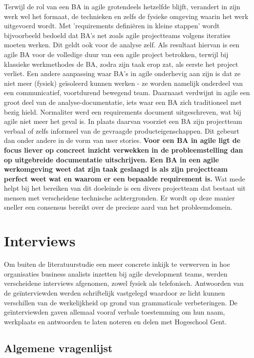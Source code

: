 \documentclass{hogent-article}
\begin{document}
Terwijl de rol van een BA in agile grotendeels hetzelfde blijft, verandert in zijn werk wel 
het formaat, de technieken en zelfs de fysieke omgeving waarin het werk uitgevoerd wordt. 
Met 'requirements definiëren in kleine stappen' wordt bijvoorbeeld bedoeld dat BA's net zoals
agile projectteams volgens iteraties moeten werken. Dit geldt ook voor de analyse zelf.
Als resultaat hiervan is een agile BA voor de volledige duur van een agile project betrokken,
terwijl bij klassieke werkmethodes de BA, zodra zijn taak erop zat, als eerste het project 
verliet. Een andere aanpassing waar BA's in agile onderhevig aan zijn is dat ze niet meer (fysiek)
geïsoleerd kunnen werken - ze worden namelijk onderdeel van een communicatief, voortdurend
bewegend team. Daarnaast verdwijnt in agile een groot deel van de analyse-documentatie, iets waar 
een BA zich traditioneel met bezig hield. Normaliter werd een requirements document uitgeschreven, 
wat bij agile niet meer het geval is. In plaats daarvan voorziet een BA zijn projectteam verbaal 
of zelfs informeel van de gevraagde producteigenschappen. Dit gebeurt dan onder andere in de 
vorm van user stories. \textbf{Voor een BA in agile ligt de focus liever op concreet inzicht 
verwekken in de probleemstelling dan op uitgebreide documentatie uitschrijven. Een BA in een 
agile werkomgeving weet dat zijn taak geslaagd is als zijn projectteam perfect weet wat en waarom 
er een bepaalde requirement is.} Wat mede helpt bij het bereiken van dit doeleinde is een divers 
projectteam dat bestaat uit mensen met verscheidene technische achtergronden. Er wordt op deze
manier sneller een consensus bereikt over de precieze aard van het probleemdomein. \autocite{expertagile}

\section{Interviews}

Om buiten de literatuurstudie een meer concrete inkijk te verwerven in hoe organisaties
business analists inzetten bij agile development teams, werden verscheidene
interviews afgenomen, zowel fysiek als telefonisch. Antwoorden van de geïnterviewden werden 
schriftelijk vastgelegd waardoor ze licht kunnen verschillen van de werkelijkheid op grond
van grammaticale verbeteringen. De geïnterviewden gaven allemaal vooraf verbale 
toestemming om hun naam, werkplaats en antwoorden te laten noteren en delen met Hogeschool Gent. 

\subsection{Algemene vragenlijst}
\end{document}
